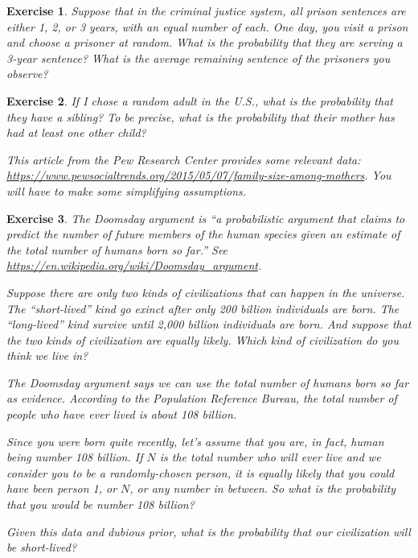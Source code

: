 \documentclass[12pt]{book}
\theoremstyle{exercise}
\newtheorem{exercise}{Exercise}[chapter]
\begin{document}
\begin{exercise}
Suppose that in the criminal justice system, all prison sentences are either 1, 2, or 3 years, with an equal number of each.  One day, you visit a prison and choose a prisoner at random.  What is the probability that they are serving a 3-year sentence?  What is the average remaining sentence of the prisoners you observe?
\end{exercise}


\begin{exercise}
If I chose a random adult in the U.S., what is the probability that they have a sibling? To be precise, what is the probability that their mother has had at least one other child?

This article from the Pew Research Center provides some relevant data: \url{https://www.pewsocialtrends.org/2015/05/07/family-size-among-mothers}.  You will have to make some simplifying assumptions.
\end{exercise}


\begin{exercise}
The Doomsday argument is ``a probabilistic argument that claims to predict the number of future members of the human species given an estimate of the total number of humans born so far.''  See \url{https://en.wikipedia.org/wiki/Doomsday_argument}.

Suppose there are only two kinds of civilizations that can happen in the universe. The ``short-lived'' kind go exinct after only 200 billion individuals are born. The ``long-lived'' kind survive until 2,000 billion individuals are born. And suppose that the two kinds of civilization are equally likely.  Which kind of civilization do you think we live in? 

The Doomsday argument says we can use the total number of humans born so far as evidence.
According to the Population Reference Bureau, the total number of people who have ever lived is about 108 billion. 

Since you were born quite recently, let's assume that you are, in fact, human being number 108 billion.
If $N$ is the total number who will ever live and we consider you to be a randomly-chosen person, it is equally likely that you could have been person 1, or $N$, or any number in between.
So what is the probability that you would be number 108 billion?

Given this data and dubious prior, what is the probability that our civilization will be short-lived?

\end{exercise}
\end{document}
